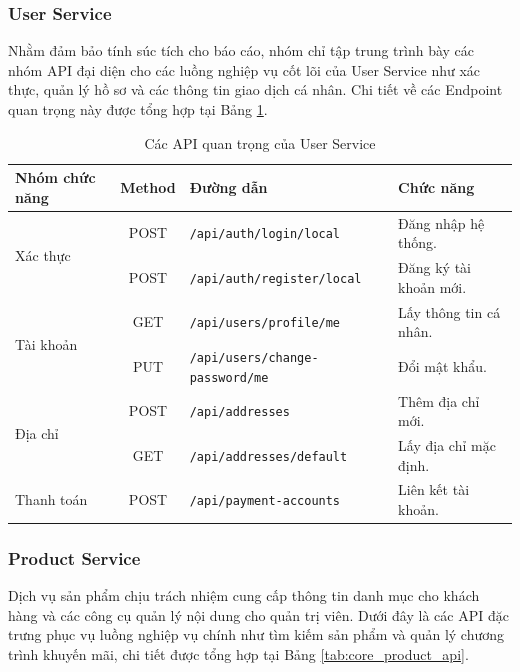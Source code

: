\subsubsection{User Service}

Nhằm đảm bảo tính súc tích cho báo cáo, nhóm chỉ tập trung trình bày các nhóm API đại diện cho các luồng nghiệp vụ cốt lõi của User Service như xác thực, quản lý hồ sơ và các thông tin giao dịch cá nhân. Chi tiết về các Endpoint quan trọng này được tổng hợp tại Bảng \ref{tab:core_user_api}.

\begin{table}[H]
\centering
\caption{Các API quan trọng của User Service}
\label{tab:core_user_api}
\begin{tabular}{|l|c|l|l|}
\hline
\textbf{Nhóm chức năng} & \textbf{Method} & \textbf{Đường dẫn} & \textbf{Chức năng} \\ \hline
\multirow{2}{*}{Xác thực} & POST & \texttt{/api/auth/login/local} & Đăng nhập hệ thống. \\ \cline{2-4} 
 & POST & \texttt{/api/auth/register/local} & Đăng ký tài khoản mới. \\ \hline
\multirow{2}{*}{Tài khoản} & GET & \texttt{/api/users/profile/me} & Lấy thông tin cá nhân. \\ \cline{2-4} 
 & PUT & \texttt{/api/users/change-password/me} & Đổi mật khẩu. \\ \hline
\multirow{2}{*}{Địa chỉ} & POST & \texttt{/api/addresses} & Thêm địa chỉ mới. \\ \cline{2-4} 
 & GET & \texttt{/api/addresses/default} & Lấy địa chỉ mặc định. \\ \hline
Thanh toán & POST & \texttt{/api/payment-accounts} & Liên kết tài khoản. \\ \hline
\end{tabular}
\end{table}

\subsubsection{Product Service}

Dịch vụ sản phẩm chịu trách nhiệm cung cấp thông tin danh mục cho khách hàng và các công cụ quản lý nội dung cho quản trị viên. Dưới đây là các API đặc trưng phục vụ luồng nghiệp vụ chính như tìm kiếm sản phẩm và quản lý chương trình khuyến mãi, chi tiết được tổng hợp tại Bảng \ref{tab:core_product_api}.

